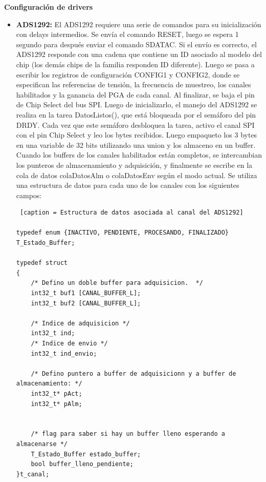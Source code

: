 \textbf{Configuración de drivers}

\begin{itemize}

 	\item \textbf{ADS1292:} El ADS1292 requiere una serie de comandos para su inicialización\cite{texas2012} con delays intermedios. Se envía el comando RESET, luego se espera 1 segundo para después enviar el comando SDATAC. Si el envío es correcto, el ADS1292 responde con una cadena que contiene un ID asociado al modelo del chip (los demás chips de la familia responden ID diferente). 
 	Luego se pasa a escribir los registros de configuración CONFIG1 y CONFIG2, donde se especifican las referencias de tensión, la frecuencia de muestreo, los canales habilitados y la ganancia del PGA de cada canal. Al finalizar, se baja el pin de Chip Select del bus SPI. 
 	Luego de inicializarlo, el manejo del ADS1292 se realiza en la tarea DatosListos(), que está bloqueada por el semáforo del pin DRDY. Cada vez que este semáforo desbloquea la tarea, activo el canal SPI con el pin Chip Select y leo los bytes recibidos. Luego empaqueto los 3 bytes en una variable de 32 bits utilizando una union y los almaceno en un buffer. Cuando los buffers de los canales habilitados están completos, se intercambian los punteros de almacenamiento y adquisición, y finalmente se escribe en la cola de datos colaDatosAlm o colaDatosEnv según el modo actual.
 	Se utiliza una estructura de datos para cada uno de los canales con los siguientes campos:
 	
\footnotesize 	
\begin{lstlisting} [caption = Estructura de datos asociada al canal del ADS1292]

typedef enum {INACTIVO, PENDIENTE, PROCESANDO, FINALIZADO} T_Estado_Buffer;

typedef struct
{
	/* Defino un doble buffer para adquisicion.  */
	int32_t buf1 [CANAL_BUFFER_L];
	int32_t buf2 [CANAL_BUFFER_L];

	/* Indice de adquisicion */
	int32_t ind;
	/* Indice de envio */
	int32_t ind_envio;

	/* Defino puntero a buffer de adquisicionn y a buffer de almacenamiento: */
	int32_t* pAct;
	int32_t* pAlm;


	/* flag para saber si hay un buffer lleno esperando a almacenarse */
	T_Estado_Buffer estado_buffer;
	bool buffer_lleno_pendiente;
}t_canal;


\end{lstlisting}	
\normalsize


\end{itemize}

